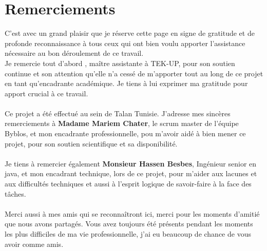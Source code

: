 \chapter*{\huge Remerciements}

C’est avec un grand plaisir que je réserve cette page en signe de gratitude et de profonde reconnaissance à tous ceux qui ont bien voulu apporter l’assistance nécessaire au bon déroulement de ce travail.\\
Je remercie tout d'abord \textbf{\@academicFramerName}, maître assistante à TEK-UP, pour son soutien continue et son attention qu'elle n'a cessé de m'apporter tout au long de ce projet en tant qu'encadrante académique. Je tiens à lui exprimer ma gratitude pour apport crucial à ce travail.\\
\\
Ce projet a été effectué au sein de Talan Tunisie. J’adresse mes sincères remerciements à \textbf{Madame Mariem Chater}, le scrum master de l'équipe Byblos, et mon encadrante professionnelle, pou m’avoir aidé à bien mener ce projet, pour son soutien scientifique et sa disponibilité.
\\
\\
Je tiens à remercier également \textbf{Monsieur Hassen Besbes}, Ingénieur senior en java, et mon encadrant technique, lors de ce projet, pour m'aider aux lacunes et aux difficultés techniques et aussi à l'esprit logique de savoir-faire à la face des tâches.
\\
\\
Merci aussi à mes amis qui se reconnaîtront ici, merci pour les moments d’amitié que nous avons partagés. Vous avez toujours été présents pendant les moments les plus difficiles de ma vie professionnelle, j’ai eu beaucoup de chance de vous avoir comme amis.
    
    
    
    

